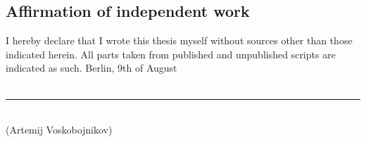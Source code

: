 \subsection*{Affirmation of independent work}
I hereby declare that I wrote this thesis myself without sources other than
those indicated herein. All parts taken from published and unpublished
scripts are indicated as such.
\parbig
Berlin, 9th of August
\\\\

\rule{120pt}{1pt}\\
(Artemij Voskobojnikov)